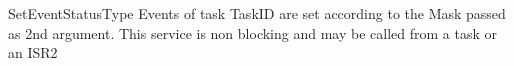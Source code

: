 \begin{service}{SetEvent}{StatusType}
Events of task TaskID are set according to the Mask passed as 2nd argument. This service is non blocking and may be called from a task or an ISR2
\end{service}
